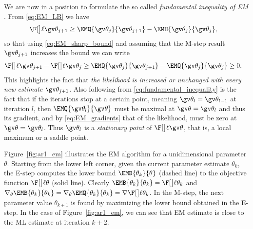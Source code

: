 We are now in a position to formulate the so called \emph{fundamental inequality of EM} \parencite{Cappe2005}.
From \eqref{eq:EM_LB} we have
\begin{align*}
	\lLH[\Th_{j+1}] & \geq \EMQ{\Th_j}{\Th_{j+1}} - \EMH{\Th_j}{\Th_{j}},
\end{align*}
so that using \eqref{eq:EM_sharp_bound} and assuming that the M-step result $\Th_{j+1}$ increases
the bound we can write
\begin{align}
	\lLH[\Th_{j+1}] - \lLH[\Th_j] & \geq \EMQ{\Th_j}{\Th_{j+1}} - \EMQ{\Th_j}{\Th_{j}} \geq 0.
\label{eq:fundamental_inequality}	
\end{align}
This highlights
the fact that \emph{the likelihood is increased or unchanged with every new estimate} $\Th_{j+1}$.
Also following from \eqref{eq:fundamental_inequality} is the fact that if the iterations
stop at a certain point, meaning $\Th_{l}=\Th_{l-1}$ at iteration $l$, then
$\EMQ{\Th_l}{\Th}$ must be maximal at $\Th=\Th_l$ and thus its gradient, and 
by \eqref{eq:EM_gradients} that of the likelihood, must be zero at $\Th=\Th_l$. Thus
$\Th_l$ is a \emph{stationary point} of $\lLH$, that is, a local maximum or a saddle point.

Figure~\ref{fig:ar1_em} illustrates the EM algorithm for a unidimensional parameter 
$\theta$. Starting from the lower left corner, given the current parameter estimate
$\theta_k$, the E-step computes the lower bound $\EMB{\theta_k}{\theta}$ (dashed line) 
to the objective function $\lLH[\theta]$ (solid line). Clearly $\EMB{\theta_k}{\theta_k}=\lLH[\theta_k]$
and $\nabla_{\theta}\EMB{\theta_k}{\theta_k}=\nabla_{\theta}\EMQ{\theta_k}{\theta_k}=\score[\theta_k]$.
In the M-step, the next parameter value $\theta_{k+1}$ is found by maximizing the lower bound obtained
in the E-step. In the case of Figure~\ref{fig:ar1_em}, we can see that EM estimate is close
to the ML estimate at iteration $k+2$. 

